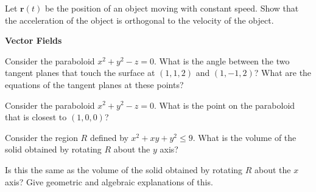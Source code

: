 \begin{Exercise}
  \label{exercise constant speed acceleration orthogonal}
  Let $\mathbf{r}(t)$ be the position of an object moving with constant
  speed.  Show that the acceleration of the object is orthogonal to the
  velocity of the object.

\end{Exercise}


\begin{large}
  \noindent
  \textbf{Vector Fields}
\end{large}



\begin{Exercise}
  \label{exercise paraboloid x2 + y2 - z}
  Consider the paraboloid $x^2 + y^2 - z = 0$.  What is the angle
  between the two tangent planes that touch the surface at $(1,1,2)$ and
  $(1,-1,2)$?  What are the equations of the tangent planes at these points?

\end{Exercise}









\begin{Exercise}
  \label{exercise paraboloid closest point}
  Consider the paraboloid $x^2 + y^2 - z = 0$.  What is the point on the
  paraboloid that is closest to $(1,0,0)$?

\end{Exercise}








\begin{Exercise}
  \label{exercise volume R rotate y}
  Consider the region $R$ defined by $x^2 + x y + y^2 \leq 9$.
  What is the volume of the solid obtained by rotating $R$ about the 
  $y$ axis?

  Is this the same as the volume of the solid obtained by rotating $R$ 
  about the $x$ axis?  Give geometric and algebraic explanations of this.

\end{Exercise}







